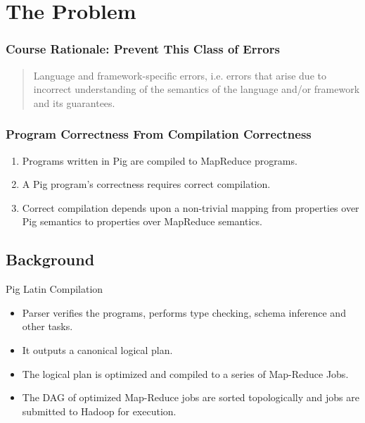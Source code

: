 \section{The Problem}
\begin{frame}
  \frametitle{Course Rationale: Prevent This Class of Errors}
  \begin{quote}
      Language and framework-specific errors, i.e. errors that arise due to
      incorrect understanding of the semantics of the language and/or framework
      and its guarantees.
  \end{quote}
\end{frame}

\begin{frame}
  \frametitle{Program Correctness From Compilation Correctness}
  \begin{enumerate}
    \item Programs written in Pig are compiled to MapReduce programs.
    \item A Pig program's correctness requires correct compilation.
    \item Correct compilation depends upon a non-trivial mapping from
      properties over Pig semantics to properties over MapReduce semantics.
  \end{enumerate}

\end{frame}

\subsection{Background}
\begin{frame}{Pig Latin Compilation}
\begin{itemize}
	\item Parser verifies the programs, performs type checking, schema inference and other tasks.
	\item It outputs a canonical logical plan.
	\item The logical plan is optimized and compiled to a series of Map-Reduce Jobs.
	\item The DAG of optimized Map-Reduce jobs are sorted topologically and jobs are submitted to Hadoop for execution. 
\end{itemize}
\end{frame}

